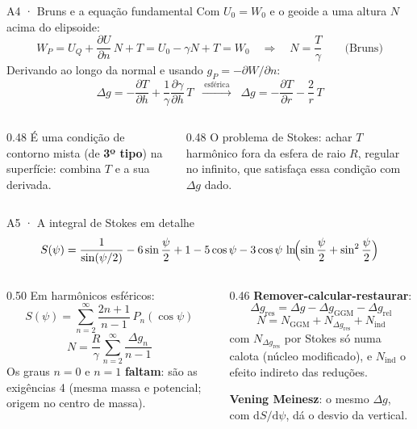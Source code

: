 \documentclass[aspectratio=169,11pt]{beamer}
\begin{document}
\begin{frame}{A4 · Bruns e a equação fundamental}
  \small
  Com $U_0 = W_0$ e o geoide a uma altura $N$ acima do elipsoide:
  \[ W_P = U_Q + \frac{\partial U}{\partial n}\,N + T = U_0 - \gamma N + T = W_0
     \quad\Longrightarrow\quad N = \frac{T}{\gamma} \qquad \text{(Bruns)} \]
  Derivando ao longo da normal e usando $g_P = -\partial W/\partial n$:
  \[ \Delta g = -\frac{\partial T}{\partial h} + \frac{1}{\gamma}
               \frac{\partial\gamma}{\partial h}\, T
     \;\;\xrightarrow{\ \text{esférica}\ }\;\;
     \Delta g = -\frac{\partial T}{\partial r} - \frac{2}{r}\, T \]
  \begin{columns}[T]
    \begin{column}{0.48\textwidth}
      É uma condição de contorno mista (de \textbf{3º tipo}) na superfície: combina $T$ e a
      sua derivada.
    \end{column}
    \begin{column}{0.48\textwidth}
      O problema de Stokes: achar $T$ harmônico fora da esfera de raio $R$, regular no
      infinito, que satisfaça essa condição com $\Delta g$ dado.
    \end{column}
  \end{columns}
\end{frame}

\begin{frame}{A5 · A integral de Stokes em detalhe}
  \small
  \[ S(\psi) = \frac{1}{\sin(\psi/2)} - 6\sin\frac{\psi}{2} + 1 - 5\cos\psi
               - 3\cos\psi\,\ln\!\Bigl(\sin\frac{\psi}{2} + \sin^2\frac{\psi}{2}\Bigr) \]
  \begin{columns}[T]
    \begin{column}{0.50\textwidth}
      Em harmônicos esféricos:
      \[ S(\psi) = \sum_{n=2}^{\infty} \frac{2n+1}{n-1}\, P_n(\cos\psi) \]
      \[ N = \frac{R}{\gamma}\sum_{n=2}^{\infty} \frac{\Delta g_n}{n-1} \]
      Os graus $n = 0$ e $n = 1$ \textbf{faltam}: são as exigências 4 (mesma massa e
      potencial; origem no centro de massa).
    \end{column}
    \begin{column}{0.46\textwidth}
      \textbf{Remover-calcular-restaurar}:
      \[ \Delta g_{\mathrm{res}} = \Delta g - \Delta g_{\mathrm{GGM}} - \Delta g_{\mathrm{rel}} \]
      \[ N = N_{\mathrm{GGM}} + N_{\Delta g_{\mathrm{res}}} + N_{\mathrm{ind}} \]
      com $N_{\Delta g_{\mathrm{res}}}$ por Stokes só numa calota (núcleo modificado), e
      $N_{\mathrm{ind}}$ o efeito indireto das reduções.
      \medskip

      \textbf{Vening Meinesz}: o mesmo $\Delta g$, com $\mathrm{d}S/\mathrm{d}\psi$, dá o
      desvio da vertical.
    \end{column}
  \end{columns}
\end{frame}
\end{document}
